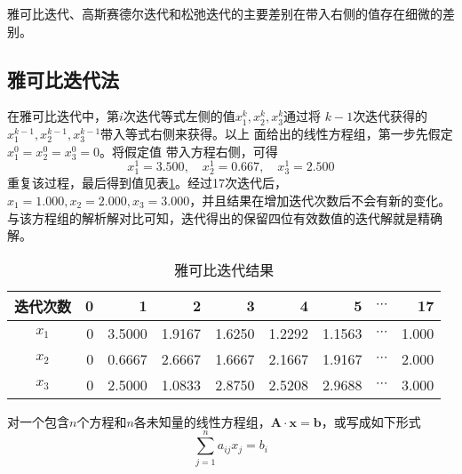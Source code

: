 雅可比迭代、高斯赛德尔迭代和松弛迭代的主要差别在带入右侧的值存在细微的差别。

\subsection{雅可比迭代法}
在雅可比迭代中，第$i$次迭代等式左侧的值$x_{1}^{k}, x_{2}^{k},x_{3}^{k}$通过将
$k-1$次迭代获得的$x_{1}^{k-1}, x_{2}^{k-1},x_{3}^{k-1}$带入等式右侧来获得。以上
面给出的线性方程组，第一步先假定$x_{1}^{0} = x_{2}^{0} = x_{3}^{0}=0$。将假定值
带入方程右侧，可得
\begin{equation*}
x_{1}^{1}=3.500,\quad x_{2}^{1}=0.667,\quad x_{3}^{1}=2.500
\end{equation*}
重复该过程，最后得到值见表\ref{TbLA_Jacobi_result}。经过17次迭代后，
$x_{1}=1.000,x_{2}=2.000,x_{3}=3.000$，并且结果在增加迭代次数后不会有新的变化。
与该方程组的解析解对比可知，迭代得出的保留四位有效数值的迭代解就是精确解。
\begin{table}[h!]
  \begin{center}
  \caption{雅可比迭代结果}
  \label{TbLA_Jacobi_result}
  \begin{tabular}{|c|r|r|r|r|r|r|r|r|}
    \hline
    迭代次数 & 0 & 1 & 2 & 3 & 4 & 5 & $\cdots$ & 17 \\
    \hline
    $x_{1}$ & 0 & 3.5000 & 1.9167 & 1.6250 & 1.2292 & 1.1563 & $\cdots$ & 1.000
    \\
    \hline
    $x_{2}$ & 0 & 0.6667 & 2.6667 & 1.6667 & 2.1667 & 1.9167 & $\cdots$ & 2.000
    \\
    \hline
    $x_{3}$ & 0 & 2.5000 & 1.0833 & 2.8750 & 2.5208 & 2.9688 & $\cdots$ & 3.000
    \\
    \hline
  \end{tabular}
  \end{center}
\end{table}

对一个包含$n$个方程和$n$各未知量的线性方程组，$\mathbf{A}\cdot \mathbf{x} =
\mathbf{b}$，或写成如下形式
\begin{equation}
  \sum_{j=1}^{n}a_{ij}x_{j} = b_{i}
\end{equation}

